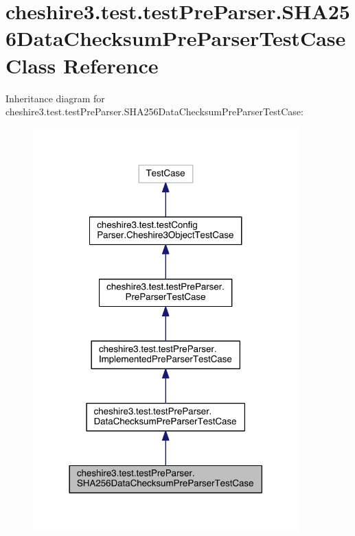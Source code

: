 \hypertarget{classcheshire3_1_1test_1_1test_pre_parser_1_1_s_h_a256_data_checksum_pre_parser_test_case}{\section{cheshire3.\-test.\-test\-Pre\-Parser.\-S\-H\-A256\-Data\-Checksum\-Pre\-Parser\-Test\-Case Class Reference}
\label{classcheshire3_1_1test_1_1test_pre_parser_1_1_s_h_a256_data_checksum_pre_parser_test_case}
}


Inheritance diagram for cheshire3.\-test.\-test\-Pre\-Parser.\-S\-H\-A256\-Data\-Checksum\-Pre\-Parser\-Test\-Case\-:
\nopagebreak
\begin{figure}[H]
\begin{center}
\leavevmode
\includegraphics[width=290pt]{classcheshire3_1_1test_1_1test_pre_parser_1_1_s_h_a256_data_checksum_pre_parser_test_case__inherit__graph}
\end{center}
\end{figure}


